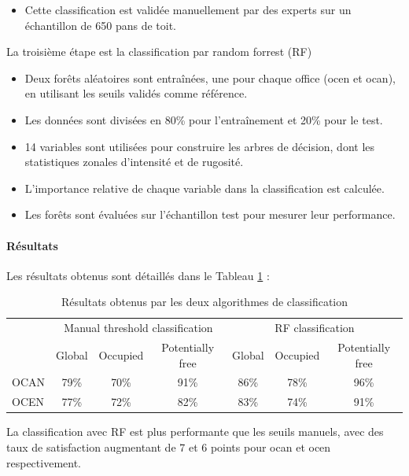 {{\begin{itemize}
\begin{itemize}
        \item Si un pan dépasse le seuil pour au moins une variable, il est classé comme "occupé", sinon il est "potentiellement libre".
    \end{itemize}
    \item Cette classification est validée manuellement par des experts sur un échantillon de 650 pans de toit.
\end{itemize}
\par{La troisième étape est la classification par random forrest (RF)}
\begin{itemize}
    \item Deux forêts aléatoires sont entraînées, une pour chaque office (\acrshort{ocen} et \acrshort{ocan}), en utilisant les seuils validés comme référence.
    \item Les données sont divisées en 80\% pour l'entraînement et 20\% pour le test.
    \item 14 variables sont utilisées pour construire les arbres de décision, dont les statistiques zonales d'intensité et de rugosité.
    \item L'importance relative de chaque variable dans la classification est calculée.
    \item Les forêts sont évaluées sur l'échantillon test pour mesurer leur performance.
\end{itemize}

\paragraph{Résultats}
\par{Les résultats obtenus sont détaillés dans le Tableau \ref{tab:stdl_01_resultats_classification} :}
\begin{table}[h]
    \centering
    \begin{tabular}{|l|c|c|c||c|c|c|}
    \hline
    \multirow{2}{*}{} & \multicolumn{3}{c||}{Manual threshold classification} & \multicolumn{3}{c|}{RF classification} \\
    \cline{2-7}
    & Global & Occupied & Potentially free & Global & Occupied & Potentially free \\
    \hline
    OCAN & 79\% & 70\% & 91\% & 86\% & 78\% & 96\% \\
    OCEN & 77\% & 72\% & 82\% & 83\% & 74\% & 91\% \\
    \hline
    \end{tabular}
    \caption{Résultats obtenus par les deux algorithmes de classification}
    \label{tab:stdl_01_resultats_classification}
\end{table}
\par{La classification avec RF est plus performante que les seuils manuels, avec des taux de satisfaction augmentant de 7 et 6 points pour \acrshort{ocan} et \acrshort{ocen} respectivement.}

}}
